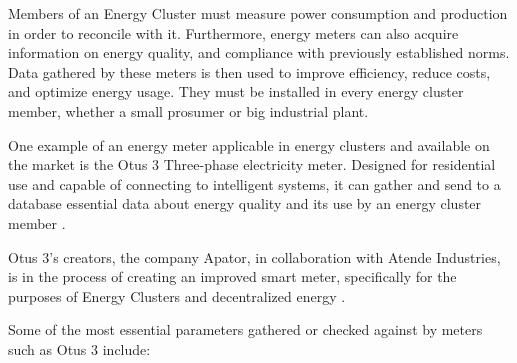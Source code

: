 \par Members of an Energy Cluster must measure power consumption and production in order to reconcile with it. Furthermore, energy meters can also acquire information on energy quality, and compliance with previously established norms. Data gathered by these meters is then used to improve efficiency, reduce costs, and optimize energy usage. They must be installed in every energy cluster member, whether a small prosumer or big industrial plant.
\par One example of an energy meter applicable in energy clusters and available on the market is the Otus 3 Three-phase electricity meter. Designed for residential use and capable of connecting to intelligent systems, it can gather and send to a database essential data about energy quality and its use by an energy cluster member \citep{otus}.
\par Otus 3's creators, the company Apator, in collaboration with Atende Industries, is in the process of creating an improved smart meter, specifically for the purposes of Energy Clusters and decentralized energy \citep{atende}.
\par Some of the most essential parameters gathered or checked against by meters such as Otus 3 include:
